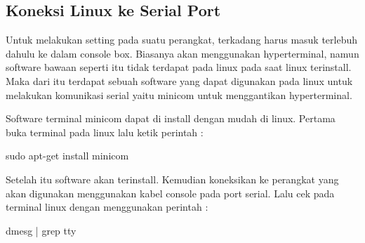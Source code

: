 	\subsection{Koneksi Linux ke Serial Port}
	Untuk melakukan setting pada suatu perangkat, terkadang harus masuk terlebuh dahulu ke dalam console box. Biasanya akan menggunakan hyperterminal, namun software bawaan seperti itu tidak terdapat pada linux pada saat linux terinstall. Maka dari itu terdapat sebuah software yang dapat digunakan pada linux untuk melakukan komunikasi serial yaitu minicom untuk menggantikan hyperterminal.
	
	Software terminal minicom dapat di install dengan mudah di linux. Pertama buka terminal pada linux lalu ketik perintah :

	sudo apt-get install minicom

	Setelah itu software akan terinstall. Kemudian koneksikan ke perangkat yang akan digunakan menggunakan kabel console pada port serial. Lalu cek pada terminal linux dengan menggunakan perintah :

	dmesg | grep tty
	
		